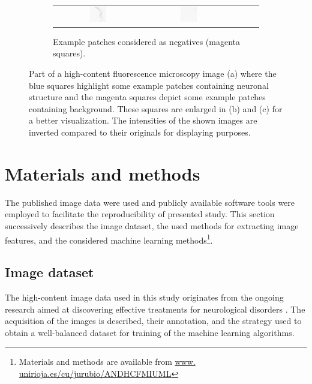 \begin{figure}
\begin{subfigure}{0.45\textwidth}
\begin{tabular}{c@{\,}c@{\,}c@{\,}c@{\,}c@{}}
			\includegraphics[width=0.19\textwidth]{fig01c14} &
			\includegraphics[width=0.19\textwidth]{fig01c15}
		\end{tabular}
		\vspace{-0.5em}
		\caption{Example patches considered as negatives (magenta squares).}
	\end{subfigure}	
	\caption{Part of a high-content fluorescence microscopy image (a) where the blue squares highlight some example patches containing neuronal structure and the magenta squares depict some example patches containing background. These squares are enlarged in (b) and (c) for a better visualization. The intensities of the shown images are inverted compared to their originals for displaying purposes.}
	\label{ch5_fig1}
\end{figure}
\section{Materials and methods}
\label{sec:matmet}
The published image data were used and publicly available software tools were employed to facilitate the reproducibility of presented study. This section successively describes the image dataset, the used methods for extracting image features, and the considered machine learning methods\footnote{Materials and methods are available from \url{www. unirioja.es/cu/jurubio/ANDHCFMIUML}}.

\subsection{Image dataset}
\label{sec:data}

The high-content image data used in this study originates from the ongoing research aimed at discovering effective treatments for neurological disorders \cite{cuesto2011phosphoinositide, enriquez2014learning, enriquez2016pi3k}. The acquisition of the images is described, their annotation, and the strategy used to obtain a well-balanced dataset for training of the machine learning algorithms.

